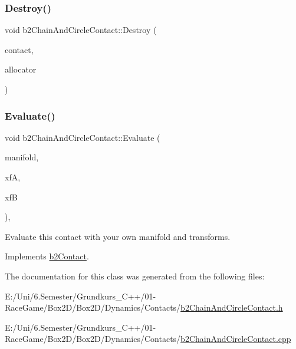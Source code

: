 \mbox{\label{classb2_chain_and_circle_contact_a1070fc727a3c52a160c7919c9650b4e3}} 
\subsubsection{\texorpdfstring{Destroy()}{Destroy()}}
{\footnotesize\ttfamily void b2\+Chain\+And\+Circle\+Contact\+::\+Destroy (\begin{DoxyParamCaption}\item[{\mbox{\hyperlink{classb2_contact}{b2\+Contact}} $\ast$}]{contact,  }\item[{\mbox{\hyperlink{classb2_block_allocator}{b2\+Block\+Allocator}} $\ast$}]{allocator }\end{DoxyParamCaption})\hspace{0.3cm}{\ttfamily [static]}}

\mbox{\label{classb2_chain_and_circle_contact_abdc7f895b76f99f7ddc444ed11986c89}} 
\subsubsection{\texorpdfstring{Evaluate()}{Evaluate()}}
{\footnotesize\ttfamily void b2\+Chain\+And\+Circle\+Contact\+::\+Evaluate (\begin{DoxyParamCaption}\item[{\mbox{\hyperlink{structb2_manifold}{b2\+Manifold}} $\ast$}]{manifold,  }\item[{const \mbox{\hyperlink{structb2_transform}{b2\+Transform}} \&}]{xfA,  }\item[{const \mbox{\hyperlink{structb2_transform}{b2\+Transform}} \&}]{xfB }\end{DoxyParamCaption})\hspace{0.3cm}{\ttfamily [override]}, {\ttfamily [virtual]}}



Evaluate this contact with your own manifold and transforms. 



Implements \mbox{\hyperlink{classb2_contact_ae3c2842e5325b2d4500f8ed1d4de2f72}{b2\+Contact}}.



The documentation for this class was generated from the following files\+:\begin{DoxyCompactItemize}
\item 
E\+:/\+Uni/6.\+Semester/\+Grundkurs\+\_\+\+C++/01-\/\+Race\+Game/\+Box2\+D/\+Box2\+D/\+Dynamics/\+Contacts/\mbox{\hyperlink{b2_chain_and_circle_contact_8h}{b2\+Chain\+And\+Circle\+Contact.\+h}}\item 
E\+:/\+Uni/6.\+Semester/\+Grundkurs\+\_\+\+C++/01-\/\+Race\+Game/\+Box2\+D/\+Box2\+D/\+Dynamics/\+Contacts/\mbox{\hyperlink{b2_chain_and_circle_contact_8cpp}{b2\+Chain\+And\+Circle\+Contact.\+cpp}}\end{DoxyCompactItemize}
